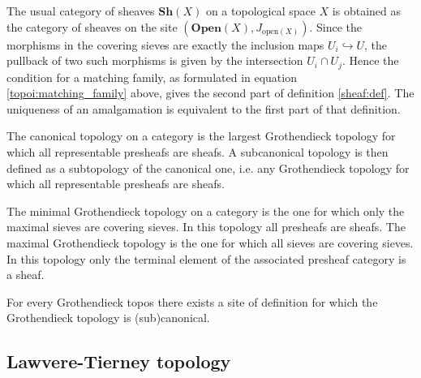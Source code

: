     \begin{example}
        The usual category of sheaves $\mathbf{Sh}(X)$ on a topological space $X$ is obtained as the category of sheaves on the site $(\mathbf{Open}(X), J_{\text{open}(X)})$. Since the morphisms in the covering sieves are exactly the inclusion maps $U_i\hookrightarrow U$, the pullback of two such morphisms is given by the intersection $U_i\cap U_j$. Hence the condition for a matching family, as formulated in equation \ref{topoi:matching_family} above, gives the second part of definition \ref{sheaf:def}. The uniqueness of an amalgamation is equivalent to the first part of that definition.
    \end{example}

    \begin{example}
        The canonical topology on a category is the largest Grothendieck topology for which all representable presheafs are sheafs. A subcanonical topology is then defined as a subtopology of the canonical one, i.e. any Grothendieck topology for which all representable presheafs are sheafs.
    \end{example}
    \begin{example}
        The minimal Grothendieck topology on a category is the one for which only the maximal sieves are covering sieves. In this topology all presheafs are sheafs. The maximal Grothendieck topology is the one for which all sieves are covering sieves. In this topology only the terminal element of the associated presheaf category is a sheaf.
    \end{example}


    \begin{property}
        For every Grothendieck topos there exists a site of definition for which the Grothendieck topology is (sub)canonical.
    \end{property}

\subsection{Lawvere-Tierney topology}

